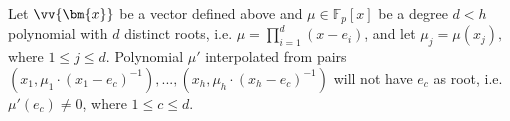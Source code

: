 \begin{proposition}\label{Attack3}
Let $\vv{\bm{x}}$ be a vector defined  above and $\mu\in \mathbb{F}_{p}[x]$ be a degree $d< h$ polynomial with $d$ distinct roots, i.e. $\mu=\prod\limits^{\scriptscriptstyle d}_{\scriptscriptstyle i=1}(x-e_{\scriptscriptstyle i})$, and let $\mu_{\scriptscriptstyle j}=\mu(x_{\scriptscriptstyle j}),$ where $1\leq j \leq d$. Polynomial $\mu'$ interpolated from pairs $(x_{\scriptscriptstyle 1}, \mu_{\scriptscriptstyle 1}\cdot (x_{\scriptscriptstyle 1}-e_{\scriptscriptstyle c})^{\scriptscriptstyle -1} ),..., (x_{\scriptscriptstyle h}, \mu_{\scriptscriptstyle h}\cdot (x_{\scriptscriptstyle h}-e_{\scriptscriptstyle c})^{\scriptscriptstyle -1} )$ will not have $e_{\scriptscriptstyle c}$ as  root, i.e. $\mu'(e_{\scriptscriptstyle c})\neq0$, where $1\leq c \leq d$. 
\end{proposition}


